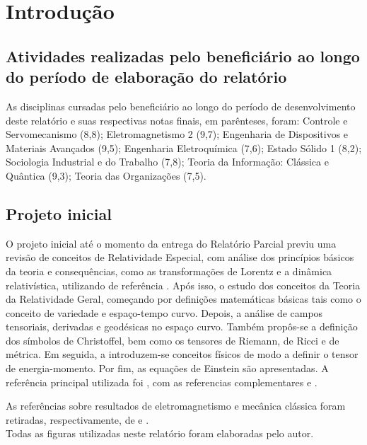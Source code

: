 \chapter*{Introdução}
\section*{Atividades realizadas pelo beneficiário ao longo do período de elaboração do relatório}

As disciplinas cursadas pelo beneficiário ao longo do período de desenvolvimento deste relatório e suas respectivas notas finais, em parênteses, foram: Controle e Servomecanismo (8,8); Eletromagnetismo 2 (9,7); Engenharia de Dispositivos e Materiais Avançados (9,5); Engenharia Eletroquímica (7,6); Estado Sólido 1 (8,2); Sociologia Industrial e do Trabalho (7,8); Teoria da Informação: Clássica e Quântica (9,3); Teoria das Organizações (7,5).


\section*{Projeto inicial}
O projeto inicial até o momento da entrega do Relatório Parcial previu uma revisão de conceitos de Relatividade Especial, com análise dos princípios básicos da teoria e consequências, como as transformações de Lorentz e a dinâmica relativística, utilizando de referência \cite{Dray2012}.
Após isso, o estudo dos conceitos da Teoria da Relatividade Geral, começando por definições matemáticas básicas tais como o conceito de variedade e espaço-tempo curvo. Depois, a análise de campos tensoriais, derivadas e geodésicas no espaço curvo. Também propôs-se a definição dos símbolos de Christoffel, bem como os tensores de Riemann, de Ricci e de métrica. Em seguida, a introduzem-se conceitos físicos de modo a definir o tensor de energia-momento. Por fim, as equações de Einstein são apresentadas.  A referência principal utilizada foi \cite{Foster2006}, com as referencias complementares \cite{Hartle2005} e \cite{Schutz2009}. 

As referências sobre resultados de eletromagnetismo e mecânica clássica foram retiradas, respectivamente, de \cite{Griffiths2005} e \cite{nussenzveig2013curso}.
\\

Todas as figuras utilizadas neste relatório foram elaboradas pelo autor.